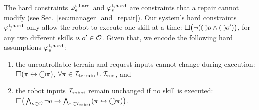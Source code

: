 
The hard constraints $\varphi_\textrm{e}^\textrm{t,hard}$ and $\varphi_\textrm{s}^\textrm{t,hard}$ are constraints that a repair cannot modify 
(see Sec.~\ref{sec:manager_and_repair}).
Our system's hard constraints
$\varphi_\textrm{s}^\textrm{t,hard}$
only allow the robot to execute one skill at a time:
    $\square\big(\neg (\bigcirc o \land \bigcirc o')\big)$, for any two different skills $o, o' \in {\mathcal O}$. 
%
Given that, 
we encode the following hard assumptions $\varphi_\textrm{e}^\textrm{t,hard}$:
\begin{enumerate}[label=(\roman*),ref=\roman*]
    \item the uncontrollable terrain and request inputs 
    cannot change during execution:
    $\square (\pi \leftrightarrow \bigcirc \pi)$,
    $\forall \pi \in {\mathcal I}_{\textrm{terrain}} \cup {\mathcal I}_{\textrm{req}}$,
    and
    \item the robot inputs ${\mathcal I}_{\textrm{robot}}$ remain unchanged if no skill is executed: 
    $\square\big(\bigwedge_{o\in{\mathcal O}} \neg o \to \bigwedge_{\pi\in{\mathcal I}_{\textrm{robot}}} (\pi \leftrightarrow \bigcirc \pi)\big)$.
\end{enumerate}

